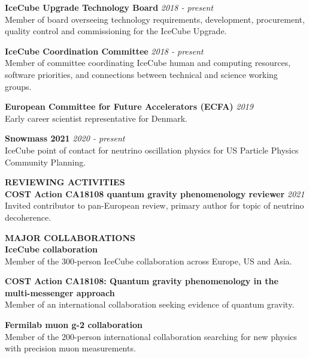 \documentclass[a4paper,11pt]{article}
\renewcommand{\smallskip} {\vspace{0.1in}}
\begin{document}
{\bf IceCube Upgrade Technology Board} \hfill {\em 2018 - present} \\ 
Member of board overseeing technology requirements, development, procurement, quality control and commissioning for the IceCube Upgrade.

{\bf IceCube Coordination Committee} \hfill {\em 2018 - present} \\ 
Member of committee coordinating IceCube human and computing resources, software priorities, and connections between technical and science working groups.

{\bf European Committee for Future Accelerators (ECFA) } \hfill {\em 2019} \\ 
Early career scientist representative for Denmark.

{\bf Snowmass 2021 } \hfill {\em 2020 - present} \\ 
IceCube point of contact for neutrino oscillation physics for US Particle Physics Community Planning.

\textbf{REVIEWING ACTIVITIES ~~\hrulefill}\smallskip\\
%
{\bf COST Action CA18108 quantum gravity phenomenology reviewer  } \hfill {\em 2021} \\ 
Invited contributor to pan-European review, primary author for topic of neutrino decoherence.


\textbf{MAJOR COLLABORATIONS ~~\hrulefill}\smallskip\\
%
{\bf IceCube collaboration} \\ 
Member of the 300-person IceCube collaboration across Europe, US and Asia.

{\bf COST Action CA18108: Quantum gravity phenomenology in the multi-messenger approach} \\ 
Member of an international collaboration seeking evidence of quantum gravity.

{\bf Fermilab muon g-2 collaboration} \\ 
Member of the 200-person international collaboration searching for new physics with precision muon measurements.


\end{document}
